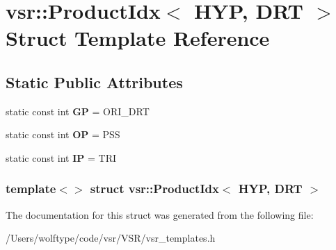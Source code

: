 \hypertarget{structvsr_1_1_product_idx_3_01_h_y_p_00_01_d_r_t_01_4}{\section{vsr\-:\-:Product\-Idx$<$ H\-Y\-P, D\-R\-T $>$ Struct Template Reference}
\label{structvsr_1_1_product_idx_3_01_h_y_p_00_01_d_r_t_01_4}
}
\subsection*{Static Public Attributes}
\begin{DoxyCompactItemize}
\item 
\hypertarget{structvsr_1_1_product_idx_3_01_h_y_p_00_01_d_r_t_01_4_a6a8a73af048e372ecadbbf7e92408201}{static const int {\bfseries G\-P} = O\-R\-I\-\_\-\-D\-R\-T}\label{structvsr_1_1_product_idx_3_01_h_y_p_00_01_d_r_t_01_4_a6a8a73af048e372ecadbbf7e92408201}

\item 
\hypertarget{structvsr_1_1_product_idx_3_01_h_y_p_00_01_d_r_t_01_4_a0060ff77b10f9760882988d2529373c7}{static const int {\bfseries O\-P} = P\-S\-S}\label{structvsr_1_1_product_idx_3_01_h_y_p_00_01_d_r_t_01_4_a0060ff77b10f9760882988d2529373c7}

\item 
\hypertarget{structvsr_1_1_product_idx_3_01_h_y_p_00_01_d_r_t_01_4_aac1e4e59a02512d748b9fc570300ac47}{static const int {\bfseries I\-P} = T\-R\-I}\label{structvsr_1_1_product_idx_3_01_h_y_p_00_01_d_r_t_01_4_aac1e4e59a02512d748b9fc570300ac47}

\end{DoxyCompactItemize}
\subsubsection*{template$<$$>$ struct vsr\-::\-Product\-Idx$<$ H\-Y\-P, D\-R\-T $>$}



The documentation for this struct was generated from the following file\-:\begin{DoxyCompactItemize}
\item 
/\-Users/wolftype/code/vsr/\-V\-S\-R/vsr\-\_\-templates.\-h\end{DoxyCompactItemize}
